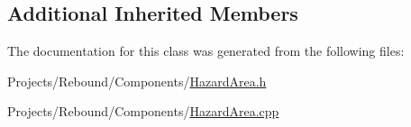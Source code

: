 \subsection*{Additional Inherited Members}


The documentation for this class was generated from the following files\-:\begin{DoxyCompactItemize}
\item 
Projects/\-Rebound/\-Components/\hyperlink{HazardArea_8h}{Hazard\-Area.\-h}\item 
Projects/\-Rebound/\-Components/\hyperlink{HazardArea_8cpp}{Hazard\-Area.\-cpp}\end{DoxyCompactItemize}
